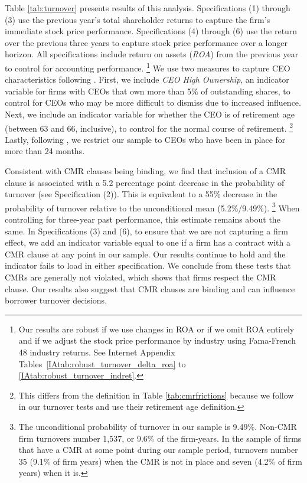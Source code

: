 \documentclass[a4paper,12pt]{article}
\begin{document}
Table \ref{tab:turnover} presents results of this analysis.
Specifications (1) through (3) use the previous year's total shareholder returns to capture the firm's immediate stock price performance.
Specifications (4) through (6) use the return over the previous three years to capture stock price performance over a longer horizon.
All specifications include return on assets (\textit{ROA}) from the previous year to control for accounting performance.%
    \footnote{Our results are robust if we use changes in ROA or if we omit ROA entirely and if we adjust the stock price performance by industry using Fama-French 48 industry returns. See Internet Appendix Tables~\ref{IAtab:robust_turnover_delta_roa} to \ref{IAtab:robust_turnover_indret}.}
We use two measures to capture CEO characteristics following \citet{Jenter_2015}.
First, we include \textit{CEO High Ownership}, an indicator variable for firms with CEOs that own more than 5\% of outstanding shares, to control for CEOs who may be more difficult to dismiss due to increased influence.
Next, we include an indicator variable for whether the CEO is of retirement age (between 63 and 66, inclusive), to control for the normal course of retirement.
    \footnote{This differs from the definition in Table \ref{tab:cmrfrictions} because we follow \citet{Jenter_2015} in our turnover tests and use their retirement age definition.}
Lastly, following \citet{Jenter_2015}, we restrict our sample to CEOs who have been in place for more than 24 months.


Consistent with CMR clauses being binding, we find that inclusion of a CMR clause is associated with a 5.2 percentage point decrease in the probability of turnover (see Specification (2)).
This is equivalent to a 55\%  decrease in the probability of turnover relative to the unconditional mean (5.2\%/9.49\%).
  \footnote{The unconditional probability of turnover in our sample is 9.49\%.
  Non-CMR firm turnovers number 1,537, or 9.6\% of the firm-years.
  In the sample of firms that have a CMR at some point during our sample period, turnovers number 35 (9.1\% of firm years) when the CMR is not in place and seven (4.2\% of firm years) when it is.}
When controlling for three-year past performance, this estimate remains about the same.
In Specifications (3) and (6), to ensure that we are not capturing a firm effect, we add an indicator variable equal to one if a firm has a contract with a CMR clause at any point in our sample.
Our results continue to hold and the indicator fails to load in either specification.
We conclude from these tests that CMRs are generally not violated, which shows that firms respect the CMR clause.
Our results also suggest that CMR clauses are binding and can influence borrower turnover decisions.
\end{document}
